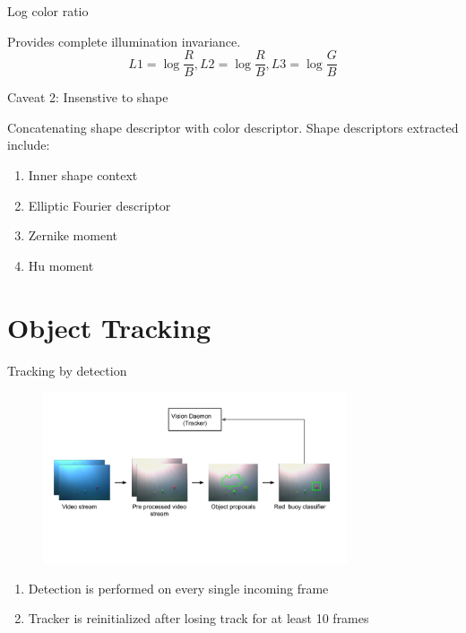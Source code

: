 \documentclass[13pt]{beamer}
\begin{document}
\begin{frame}{Log color ratio}

  Provides complete illumination invariance.
  \[
    L1 = \log{\frac{R}{B}}, L2 = \log{\frac{R}{B}}, L3 = \log{\frac{G}{B}}
  \]
\end{frame}

\begin{frame}{Caveat 2: Insenstive to shape}

  Concatenating shape descriptor with color descriptor. Shape descriptors
  extracted include:

  \begin{enumerate}
    \item Inner shape context
    \item Elliptic Fourier descriptor
    \item Zernike moment
    \item Hu moment
  \end{enumerate}

\end{frame}


\section{Object Tracking}

\begin{frame}{Tracking by detection}

  \begin{figure}[ht]
      \centering
      \includegraphics[width=0.8\textwidth, height=0.4\textwidth]{figs/tracker.png}
  \end{figure}

  \begin{enumerate}
    \item Detection is performed on every single incoming frame
    \item Tracker is reinitialized after losing track for at least 10 frames
  \end{enumerate}
\end{frame}
\end{document}
